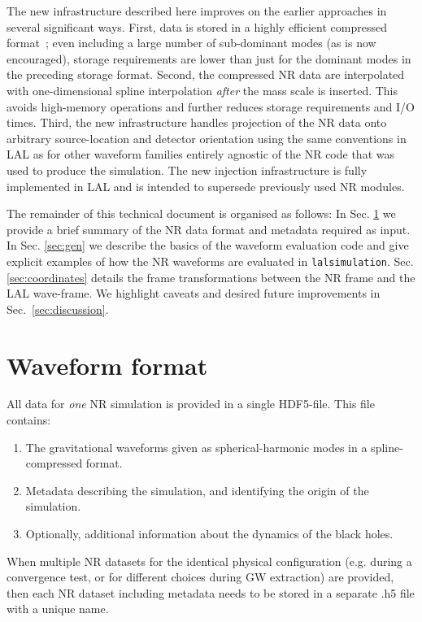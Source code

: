\documentclass[11pt,tightenlines,article,amssymb,amsmath,amsfonts,superscriptaddress,nofootinbib]{revtex4}
\begin{document}
The new infrastructure described here improves on the earlier approaches
in several significant ways. First, data is stored in a highly efficient compressed format~\cite{Galley:2016mvy}; even including a large number of sub-dominant modes (as is now encouraged), storage requirements are lower than just for the dominant modes in the preceding storage format.  
Second, the compressed NR data are interpolated with one-dimensional spline interpolation \emph{after} the mass scale is inserted. This avoids high-memory operations and further reduces storage requirements and I/O times. Third, the new infrastructure handles projection of the NR data onto arbitrary source-location and detector orientation using the same conventions in LAL as for other waveform families entirely agnostic of the NR code that was used to produce the simulation. The new injection infrastructure is fully implemented in LAL and is intended to supersede previously used NR modules.

The remainder of this technical document is organised as follows: In Sec. \ref{sec:format} we provide a brief summary
of the NR data format and metadata required as input. In Sec. \ref{sec:gen} we describe the basics of the waveform evaluation code and give explicit examples of how the NR waveforms are evaluated in \texttt{lalsimulation}. Sec. \ref{sec:coordinates} details the frame transformations between the NR frame and the LAL wave-frame. We highlight caveats and desired future improvements in Sec.~\ref{sec:discussion}.

\section{Waveform format}
\label{sec:format}
All data for \emph{one} NR simulation is provided in a single HDF5-file.
  This file contains:
  \begin{enumerate}
    \item The gravitational waveforms given as spherical-harmonic
      modes in a spline-compressed format.
    \item Metadata describing the simulation, and identifying the
      origin of the simulation.
      \item Optionally, additional information about the dynamics of
        the black holes.
  \end{enumerate}
When multiple NR datasets for the
identical physical configuration (e.g. during a convergence test, or
for different choices during GW extraction) are provided, then each NR dataset 
including metadata needs to be stored in a separate .h5 file with a unique name.
\end{document}

